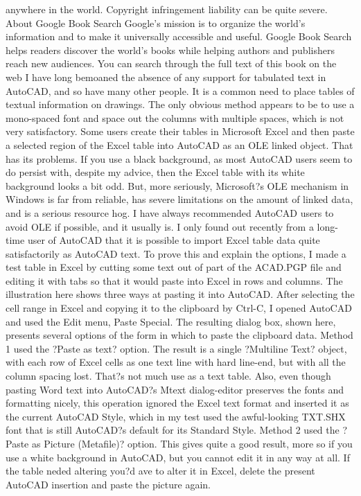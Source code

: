 \documentclass[a4paper]{article}
\begin{document}
anywhere in the world. Copyright infringement liability can be quite severe. 
About Google Book Search 
Google's mission is to organize the world's information and to make it universally accessible and useful. Google Book Search helps readers 
discover the world's books while helping authors and publishers reach new audiences. You can search through the full text of this book on the web 
I have long bemoaned the absence of any support for tabulated text in AutoCAD, and so have many other people. It is a common need to place tables of textual information on drawings. The only obvious method appears to be to use a mono-spaced font and space out the columns with multiple spaces, which is not very satisfactory.
Some users create their tables in Microsoft Excel and then paste a selected region of the Excel table into AutoCAD as an OLE linked object. That has its problems. If you use a black background, as most AutoCAD users seem to do persist with, despite my advice, then the Excel table with its white background looks a bit odd. But, more seriously, Microsoft?s OLE mechanism in Windows is far from reliable, has severe limitations on the amount of linked data, and is a serious resource hog. I have always recommended AutoCAD users to avoid OLE if possible, and it usually is.
I only found out recently from a long-time user of AutoCAD that it is possible to import Excel table data quite satisfactorily as AutoCAD text. To prove this and explain the options, I made a test table in Excel by cutting some text out of part of the ACAD.PGP file and editing it with tabs so that it would paste into Excel in rows and columns. The illustration here shows three ways at pasting it into AutoCAD. After selecting the cell range in Excel and copying it to the clipboard by Ctrl-C, I opened AutoCAD and used the Edit menu, Paste Special. The resulting dialog box, shown here, presents several options of the form in which to paste the clipboard data.
Method 1 used the ?Paste as text? option. The result is a single ?Multiline Text? object, with each row of Excel cells as one text line with hard line-end, but with all the column spacing lost. That?s not much use as a text table. Also, even though pasting Word text into AutoCAD?s Mtext dialog-editor preserves the fonts and formatting nicely, this operation ignored the Excel text format and inserted it as the current AutoCAD Style, which in my test used the awful-looking TXT.SHX font that is still AutoCAD?s default for its Standard Style.
Method 2 used the ?Paste as Picture (Metafile)? option. This gives quite a good result, more so if you use a white background in AutoCAD, but you cannot edit it in any way at all. If the table neded altering you?d ave to alter it in Excel, delete the present AutoCAD insertion and paste the picture again.
\end{document}

